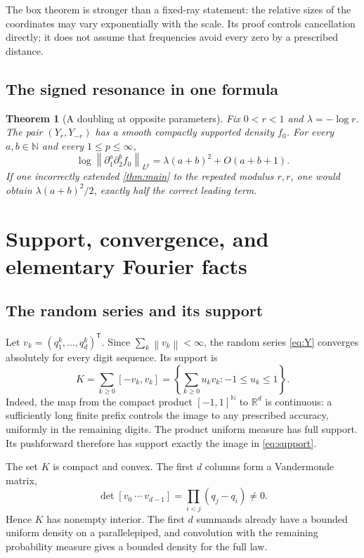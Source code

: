 \documentclass[11pt,a4paper]{article}
\numberwithin{equation}{section}
\newtheorem{theorem}{Theorem}[section]
\theoremstyle{definition}
\theoremstyle{remark}\newtheorem{remark}[theorem]{Remark}
\newcommand{\R}{\mathbb R}\newcommand{\N}{\mathbb N}
\newcommand{\norm}[1]{\left\lVert #1\right\rVert}
\begin{document}
The box theorem is stronger than a fixed-ray statement: the relative sizes
of the coordinates may vary exponentially with the scale. Its proof controls
cancellation directly; it does not assume that frequencies avoid every zero
by a prescribed distance.

\subsection{The signed resonance in one formula}

\begin{theorem}[A doubling at opposite parameters]
\label{thm:resonance-intro}
Fix $0<r<1$ and $\lambda=-\log r$. The pair $(Y_r,Y_{-r})$ has a smooth
compactly supported density $f_0$. For every $a,b\in\N$ and every
$1\le p\le\infty$,
\begin{equation}
 \log\norm{\partial_1^a\partial_2^bf_0}_{L^p}
       =\lambda(a+b)^2+O(a+b+1).
 \label{eq:resonance-law}
\end{equation}
If one incorrectly extended \cref{thm:main} to the repeated modulus $r,r$,
one would obtain $\lambda(a+b)^2/2$, exactly half the correct leading term.
\end{theorem}

\section{Support, convergence, and elementary Fourier facts}
\label{sec:prelim}

\subsection{The random series and its support}

Let $v_k=(q_1^k,\ldots,q_d^k)^{\mathsf T}$. Since
$\sum_k\norm{v_k}<\infty$, the random series \eqref{eq:Y} converges absolutely
for every digit sequence. Its support is
\begin{equation}
 K=\sum_{k\ge0}[-v_k,v_k]
  =\left\{\sum_{k\ge0}u_kv_k:-1\le u_k\le1\right\}.
 \label{eq:support}
\end{equation}
Indeed, the map from the compact product $[-1,1]^{\N}$ to $\R^d$ is
continuous: a sufficiently long finite prefix controls the image to any
prescribed accuracy, uniformly in the remaining digits. The product uniform
measure has full support. Its pushforward therefore has support exactly the
image in \eqref{eq:support}.

The set $K$ is compact and convex. The first $d$ columns form a Vandermonde
matrix,
\begin{equation}
 \det[v_0\ \cdots\ v_{d-1}]=\prod_{i<j}(q_j-q_i)\ne0.
 \label{eq:Vandermonde}
\end{equation}
Hence $K$ has nonempty interior. The first $d$ summands already have a bounded
uniform density on a parallelepiped, and convolution with the remaining
probability measure gives a bounded density for the full law.
\end{document}
